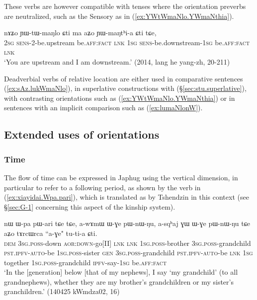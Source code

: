 These verbs are however compatible with tenses where the orientation preverbs are neutralized, such as the Sensory  as in (\ref{ex:YWtWmaNlo.YWmaNthia}).

\begin{exe}
\ex \label{ex:YWtWmaNlo.YWmaNthia}
\gll  nɤʑo ɲɯ-tɯ-maŋlo ɕti ma aʑo ɲɯ-maŋtʰi-a ɕti tɕe, \\
\textsc{2sg} \textsc{sens}-2-be.upstream be.\textsc{aff}:\textsc{fact} \textsc{lnk} \textsc{1sg} \textsc{sens}-be.downstream-\textsc{1sg} be.\textsc{aff}:\textsc{fact} \textsc{lnk} \\
\glt `You are upstream and I am downstream.' (2014, lang he yang-zh, 20-211)
\end{exe}

Deadverbial verbs of relative location are either used in comparative sentences (\ref{ex:sAz.lukWmaNlo}), in superlative constructions with  (§\ref{sec:stu.superlative}), with contrasting orientations such as (\ref{ex:YWtWmaNlo.YWmaNthia})  or in sentences with an implicit comparison such as (\ref{ex:lumaNlonW}). 


\subsection{Extended uses of orientations} \label{sec:orientation.extended}

\subsubsection{Time} \label{sec:vertical.preverbs.time}
The flow of time can be expressed in Japhug using the vertical dimension, in particular to refer to a following period, as shown by the verb   in (\ref{ex:xiayidai.Wpa.pari}), which is translated as  by Tshendzin in this context (see §\ref{sec:G-1} concerning this aspect of the kinship system).

\begin{exe}
\ex \label{ex:xiayidai.Wpa.pari}
\gll nɯ ɯ-pa pɯ-ari tɕe tɕe, a-wɤmɯ ɯ-ɣe pɯ-nɯ-ŋu, a-sqʰaj ɣɯ ɯ-ɣe pɯ-nɯ-ŋu tɕe aʑo tɤrcɯrca ``a-ɣe" tu-ti-a ɕti. \\
\textsc{dem} \textsc{3sg}.\textsc{poss}-down \textsc{aor}:\textsc{down}-go[II] \textsc{lnk} \textsc{lnk} \textsc{1sg}.\textsc{poss}-brother \textsc{3sg}.\textsc{poss}-grandchild \textsc{pst}.\textsc{ipfv}-\textsc{auto}-be \textsc{1sg}.\textsc{poss}-sister \textsc{gen} \textsc{3sg}.\textsc{poss}-grandchild \textsc{pst}.\textsc{ipfv}-\textsc{auto}-be \textsc{lnk} \textsc{1sg} together \textsc{1sg}.\textsc{poss}-grandchild \textsc{ipfv}-say-\textsc{1sg} be.\textsc{aff}:\textsc{fact} \\
\glt `In the [generation] below [that of my nephews], I say  `my grandchild' (to all grandnephews), whether they are my brother's grandchildren or my sister's granchildren.' (140425 kWmdza02, 16)
\end{exe}


